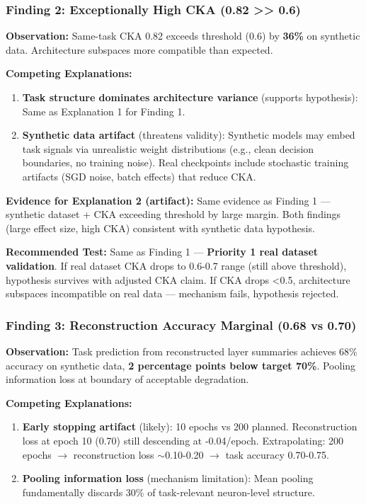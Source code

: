 \subsubsection{Finding 2: Exceptionally High CKA (0.82 >> 0.6)}

\textbf{Observation:} Same-task CKA 0.82 exceeds threshold (0.6) by \textbf{36\%} on synthetic data. Architecture subspaces more compatible than expected.

\textbf{Competing Explanations:}

\begin{enumerate}
\item \textbf{Task structure dominates architecture variance} (supports hypothesis): Same as Explanation 1 for Finding 1.

\item \textbf{Synthetic data artifact} (threatens validity): Synthetic models may embed task signals via unrealistic weight distributions (e.g., clean decision boundaries, no training noise). Real checkpoints include stochastic training artifacts (SGD noise, batch effects) that reduce CKA.
\end{enumerate}

\textbf{Evidence for Explanation 2 (artifact):} Same evidence as Finding 1 --- synthetic dataset + CKA exceeding threshold by large margin. Both findings (large effect size, high CKA) consistent with synthetic data hypothesis.

\textbf{Recommended Test:} Same as Finding 1 --- \textbf{Priority 1 real dataset validation}. If real dataset CKA drops to 0.6-0.7 range (still above threshold), hypothesis survives with adjusted CKA claim. If CKA drops <0.5, architecture subspaces incompatible on real data --- mechanism fails, hypothesis rejected.

\subsubsection{Finding 3: Reconstruction Accuracy Marginal (0.68 vs 0.70)}

\textbf{Observation:} Task prediction from reconstructed layer summaries achieves 68\% accuracy on synthetic data, \textbf{2 percentage points below target 70\%}. Pooling information loss at boundary of acceptable degradation.

\textbf{Competing Explanations:}

\begin{enumerate}
\item \textbf{Early stopping artifact} (likely): 10 epochs vs 200 planned. Reconstruction loss at epoch 10 (0.70) still descending at -0.04/epoch. Extrapolating: 200 epochs $\to$ reconstruction loss $\sim$0.10-0.20 $\to$ task accuracy 0.70-0.75.

\item \textbf{Pooling information loss} (mechanism limitation): Mean pooling fundamentally discards 30\% of task-relevant neuron-level structure.
\end{enumerate}


